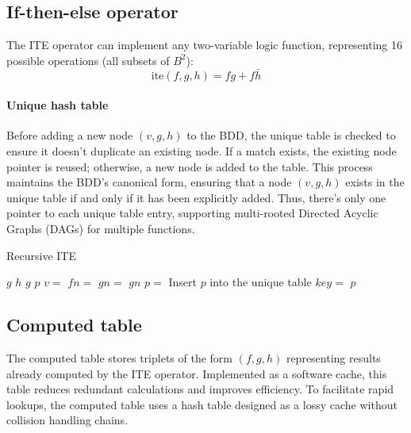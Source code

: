 \subsection{If-then-else operator}
The ITE operator can implement any two-variable logic function, representing 16 possible operations (all subsets of $B^2$): 
\[\text{ite}(f,g,h)=fg+f\bar{h}\]

\paragraph*{Unique hash table}
Before adding a new node $(v, g, h)$ to the BDD, the unique table is checked to ensure it doesn't duplicate an existing node.
If a match exists, the existing node pointer is reused; otherwise, a new node is added to the table.
This process maintains the BDD's canonical form, ensuring that a node $(v, g, h)$ exists in the unique table if and only if it has been explicitly added. 
Thus, there's only one pointer to each unique table entry, supporting multi-rooted Directed Acyclic Graphs (DAGs) for multiple functions.
\begin{algorithm}[H]
    \caption{Recursive ITE}
    \begin{algorithmic}
                \State \Return $g$
            \EndIf
                \State \Return $h$
            \EndIf
                \State \Return $g$
            \EndIf
                \State \Return $p$
            \EndIf
            \State $v=$ 
            \State $fn=$ 
            \State $gn=$ 
                \State \Return $gn$
            \EndIf
                \State $p=$ 
                \State Insert $p$ into the unique table
            \EndIf
            \State $key=$ 
            \State {}
            \State \Return $p$
        \EndFunction
    \end{algorithmic}
\end{algorithm}

\subsection{Computed table}
The computed table stores triplets of the form $(f,g,h)$ representing results already computed by the ITE operator.
Implemented as a software cache, this table reduces redundant calculations and improves efficiency. 
To facilitate rapid lookups, the computed table uses a hash table designed as a lossy cache without collision handling chains.


